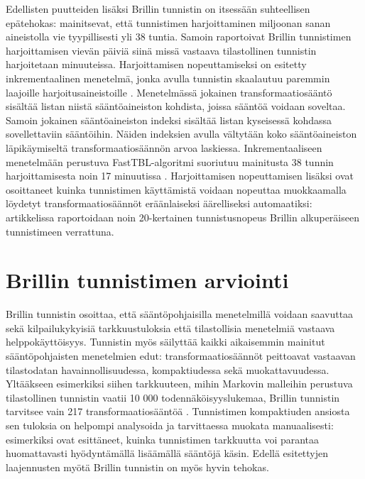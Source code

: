 \documentclass[utf8,bachelor,manualbib]{gradu3}
\begin{document}
Edellisten puutteiden lisäksi Brillin tunnistin on itsessään suhteellisen epätehokas:  mainitsevat, että tunnistimen harjoittaminen miljoonan sanan aineistolla vie tyypillisesti yli 38 tuntia. Samoin  raportoivat Brillin tunnistimen harjoittamisen vievän päiviä siinä missä vastaava tilastollinen tunnistin harjoitetaan minuuteissa. Harjoittamisen nopeuttamiseksi on esitetty inkrementaalinen menetelmä, jonka avulla tunnistin skaalautuu paremmin laajoille harjoitusaineistoille \citep{ramshaw1994}. Menetelmässä jokainen transformaatiosääntö sisältää listan niistä sääntöaineiston kohdista, joissa sääntöä voidaan soveltaa. Samoin jokainen sääntöaineiston indeksi sisältää listan kyseisessä kohdassa sovellettaviin sääntöihin. Näiden indeksien avulla vältytään koko sääntöaineiston läpikäymiseltä transformaatiosäännön arvoa laskiessa. Inkrementaaliseen menetelmään perustuva FastTBL-algoritmi suoriutuu mainitusta 38 tunnin harjoittamisesta noin 17 minuutissa \citep{ngai2001}. Harjoittamisen nopeuttamisen lisäksi  ovat osoittaneet kuinka tunnistimen käyttämistä voidaan nopeuttaa muokkaamalla löydetyt transformaatiosäännöt eräänlaiseksi äärelliseksi automaatiksi: artikkelissa raportoidaan noin 20-kertainen tunnistusnopeus Brillin alkuperäiseen tunnistimeen verrattuna.

\section{Brillin tunnistimen arviointi}

Brillin tunnistin osoittaa, että sääntöpohjaisilla menetelmillä voidaan saavuttaa sekä kilpailukykyisiä tarkkuustuloksia että tilastollisia menetelmiä vastaava helppokäyttöisyys. Tunnistin myös säilyttää kaikki aikaisemmin mainitut sääntöpohjaisten menetelmien edut: transformaatiosäännöt peittoavat vastaavan tilastodatan havainnollisuudessa, kompaktiudessa sekä muokattavuudessa. Yltääkseen esimerkiksi siihen tarkkuuteen, mihin Markovin malleihin perustuva tilastollinen tunnistin vaatii 10 000 todennäköisyyslukemaa, Brillin tunnistin tarvitsee vain 217 transformaatiosääntöä \citep{brill1994}. Tunnistimen kompaktiuden ansiosta sen tuloksia on helpompi analysoida ja tarvittaessa muokata manuaalisesti: esimerkiksi  ovat esittäneet, kuinka tunnistimen tarkkuutta voi parantaa huomattavasti hyödyntämällä lisäämällä sääntöjä käsin.  Edellä esitettyjen laajennusten myötä Brillin tunnistin on myös hyvin tehokas.
\end{document}
